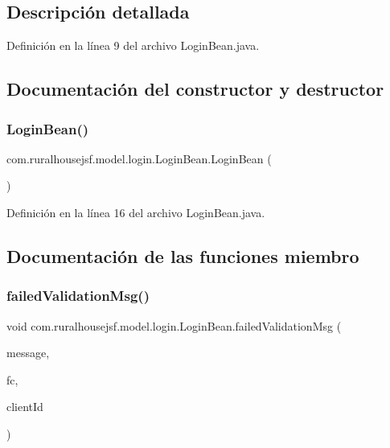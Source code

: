 \subsection{Descripción detallada}


Definición en la línea 9 del archivo Login\+Bean.\+java.



\subsection{Documentación del constructor y destructor}
\mbox{\label{a00232_ae77b2f684ab6b7fc6f4fd4274ccd2c84}} 
\subsubsection{\texorpdfstring{LoginBean()}{LoginBean()}}
{\footnotesize\ttfamily com.\+ruralhousejsf.\+model.\+login.\+Login\+Bean.\+Login\+Bean (\begin{DoxyParamCaption}{ }\end{DoxyParamCaption})}



Definición en la línea 16 del archivo Login\+Bean.\+java.



\subsection{Documentación de las funciones miembro}
\mbox{\label{a00232_a79fa6a37fba3ce108e71cb637bf899a0}} 
\subsubsection{\texorpdfstring{failedValidationMsg()}{failedValidationMsg()}}
{\footnotesize\ttfamily void com.\+ruralhousejsf.\+model.\+login.\+Login\+Bean.\+failed\+Validation\+Msg (\begin{DoxyParamCaption}\item[{String}]{message,  }\item[{Faces\+Context}]{fc,  }\item[{String}]{client\+Id }\end{DoxyParamCaption})\hspace{0.3cm}{\ttfamily [private]}}



